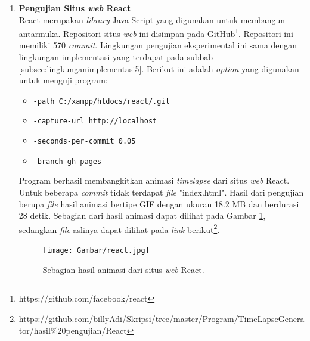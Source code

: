 \begin{enumerate}
\item \textbf{Pengujian Situs \textit{web} React}\\
React merupakan \textit{library} Java Script yang digunakan untuk membangun antarmuka. Repositori situs \textit{web} ini disimpan pada GitHub\footnote{https://github.com/facebook/react}. Repositori ini memiliki 570 \textit{commit}. Lingkungan pengujian eksperimental ini sama dengan lingkungan implementasi yang terdapat pada subbab \ref{subsec:lingkunganimplementasi5}. Berikut ini adalah \textit{option} yang digunakan untuk menguji program:
\begin{itemize}
\item \texttt{-path C:/xampp/htdocs/react/.git}
\item \texttt{-capture-url http://localhost}
\item \texttt{-seconds-per-commit 0.05}
\item \texttt{-branch gh-pages} 
\end{itemize}
Program berhasil membangkitkan animasi \textit{timelapse} dari situs \textit{web} React. Untuk beberapa \textit{commit} tidak terdapat \textit{file} "index.html". Hasil dari pengujian berupa \textit{file} hasil animasi bertipe GIF dengan ukuran 18.2 MB dan berdurasi 28 detik. Sebagian dari hasil animasi dapat dilihat pada Gambar \ref{fig:hasil_react}, sedangkan \textit{file} aslinya dapat dilihat pada \textit{link} berikut\footnote{https://github.com/billyAdi/Skripsi/tree/master/Program/TimeLapseGenerator/hasil\%20pengujian/React}.


\begin{figure}[H]	
		\texttt{[image: Gambar/react.jpg]}
	\caption{Sebagian hasil animasi dari situs \textit{web} React.}
	\label{fig:hasil_react}
\end{figure}





\end{enumerate}
